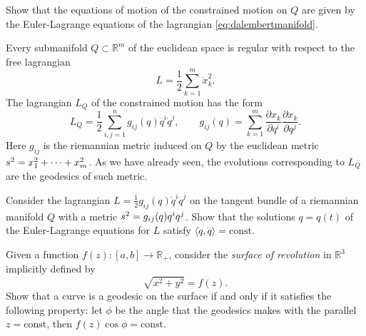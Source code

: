 \documentclass[english,fontsize=11pt,paper=a5,oneside]{scrbook}
\newcommand{\R}{\mathbb{R}}
\let\d\relax
\newcommand{\d}{\mathrm{d}}
\theoremstyle{definition}
\newenvironment{example}
  {\pushQED{\qed}\renewcommand{\qedsymbol}{$\lozenge$}\examplex}
  {\popQED\endexamplex}
\newenvironment{exercise}
  {\pushQED{\qed}\renewcommand{\qedsymbol}{$\maltese$}\exercisex}
  {\popQED\endexercisex}
\begin{document}
\begin{exercise}
  Show that the equations of motion of the constrained motion on $Q$ are given by the Euler-Lagrange equations of the lagrangian \eqref{eq:dalembertmanifold}.
\end{exercise}

\begin{example}
  Every submanifold $Q\subset \R^m$ of the euclidean space is regular with respect to the free lagrangian
  \begin{equation}
    L = \frac12 \sum_{k=1}^m \dot x^2_k.
  \end{equation}
  The lagrangian $L_Q$ of the constrained motion has the form
  \begin{equation}
    L_Q = \frac12 \sum_{i,j=1}^n g_{ij}(q)\dot q^i\dot q^j, \qquad g_{ij}(q) = \sum_{k=1}^m \frac{\partial x_k}{\partial q^i}\frac{\partial x_k}{\partial q^j}.
  \end{equation}
  Here $g_{ij}$ is the riemannian metric induced on $Q$ by the euclidean metric $\d s^2 = \d x_1^2 + \cdots + \d x_m^2$.
  As we have already seen, the evolutions corresponding to $L_Q$ are the geodesics of such metric.
\end{example}

\begin{exercise}
  Consider the lagrangian $L=\frac12 g_{ij}(q)\dot q^i \dot q^j$ on the tangent bundle of a riemannian manifold $Q$ with a metric $\d s^2 = g_{ij}(q)\d q^i \d q^j$.
  Show that the solutions $q=q(t)$ of the Euler-Lagrange equations for $L$ satisfy $\langle\dot q, \dot q\rangle= \mathrm{const}$.
\end{exercise}

\begin{exercise}[Clairaut's relation]
  Given a function $f(z): [a,b] \to \R_+$, consider the \emph{surface of revolution} in $\R^3$ implicitly defined by
  \begin{equation}
    \sqrt{x^2 + y^2} = f(z).
  \end{equation}
  Show that a curve is a geodesic on the surface if and only if it satisfies the following property: let $\phi$ be the angle that the geodesics makes with the parallel $z=\mathrm{const}$, then $f(z)\cos \phi = \mathrm{const}$.
\end{exercise}
\end{document}
